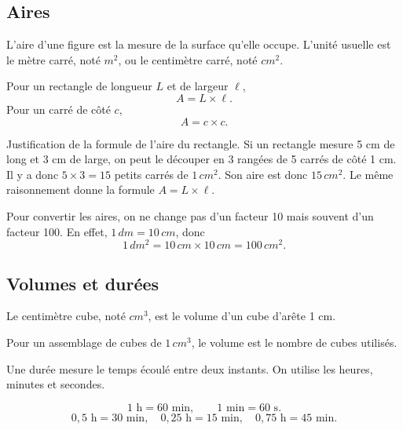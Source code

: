 \documentclass[11pt,a4paper]{article}
\begin{document}
\subsection{Aires}

\begin{definitionbox}
L'aire d'une figure est la mesure de la surface qu'elle occupe. L'unité usuelle est le mètre carré, noté \(m^2\), ou le centimètre carré, noté \(cm^2\).
\end{definitionbox}

\begin{proprbox}
Pour un rectangle de longueur \(L\) et de largeur \(\ell\),
\[
A=L\times\ell.
\]
Pour un carré de côté \(c\),
\[
A=c\times c.
\]
\end{proprbox}

\begin{preuvebox}
Justification de la formule de l'aire du rectangle. Si un rectangle mesure 5 cm de long et 3 cm de large, on peut le découper en 3 rangées de 5 carrés de côté 1 cm. Il y a donc \(5\times3=15\) petits carrés de \(1\,cm^2\). Son aire est donc \(15\,cm^2\). Le même raisonnement donne la formule \(A=L\times\ell\).
\end{preuvebox}

\begin{erreurbox}
Pour convertir les aires, on ne change pas d'un facteur 10 mais souvent d'un facteur 100. En effet, \(1\,dm=10\,cm\), donc
\[
1\,dm^2=10\,cm\times10\,cm=100\,cm^2.
\]
\end{erreurbox}

\subsection{Volumes et durées}

\begin{definitionbox}
Le centimètre cube, noté \(cm^3\), est le volume d'un cube d'arête 1 cm.
\end{definitionbox}

Pour un assemblage de cubes de \(1\,cm^3\), le volume est le nombre de cubes utilisés.

\begin{definitionbox}
Une durée mesure le temps écoulé entre deux instants. On utilise les heures, minutes et secondes.
\end{definitionbox}

\begin{retenirbox}
\[
1\text{ h}=60\text{ min},\qquad 1\text{ min}=60\text{ s}.
\]
\[
0,5\text{ h}=30\text{ min},\quad 0,25\text{ h}=15\text{ min},\quad 0,75\text{ h}=45\text{ min}.
\]
\end{retenirbox}
\end{document}
